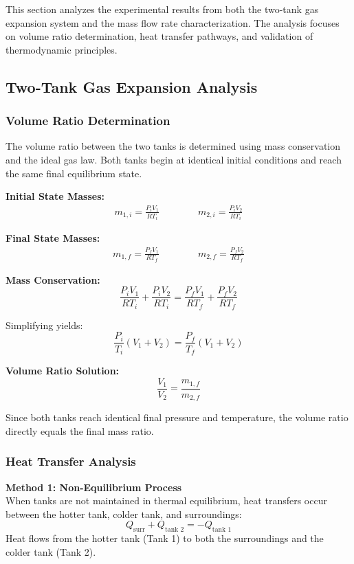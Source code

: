 \documentclass{article} %
\begin{document}
\begin{multicols}{2}
This section analyzes the experimental results from both the two-tank gas expansion system and the mass flow rate characterization. The analysis focuses on volume ratio determination, heat transfer pathways, and validation of thermodynamic principles.

\subsection{Two-Tank Gas Expansion Analysis}

\subsubsection{Volume Ratio Determination}
The volume ratio between the two tanks is determined using mass conservation and the ideal gas law. Both tanks begin at identical initial conditions and reach the same final equilibrium state.

\textbf{Initial State Masses:}
\begin{align*}
m_{1,i} = \frac{P_i V_1}{R T_i} \qquad\qquad
m_{2,i} = \frac{P_i V_2}{R T_i}
\end{align*}

\textbf{Final State Masses:}
\begin{align*}
m_{1,f} = \frac{P_f V_1}{R T_f} \qquad\qquad
m_{2,f} = \frac{P_f V_2}{R T_f}
\end{align*}

\textbf{Mass Conservation:}
\[
\frac{P_i V_1}{R T_i} + \frac{P_i V_2}{R T_i} = \frac{P_f V_1}{R T_f} + \frac{P_f V_2}{R T_f}
\]

Simplifying yields:
\[
\frac{P_i}{T_i}(V_1 + V_2) = \frac{P_f}{T_f}(V_1 + V_2)
\]

\textbf{Volume Ratio Solution:}
\[
\boxed{\frac{V_1}{V_2} = \frac{m_{1,f}}{m_{2,f}}}
\]

Since both tanks reach identical final pressure and temperature, the volume ratio directly equals the final mass ratio.

\subsubsection{Heat Transfer Analysis}
\textbf{Method 1: Non-Equilibrium Process}\\
When tanks are not maintained in thermal equilibrium, heat transfers occur between the hotter tank, colder tank, and surroundings:
\[
Q_{\text{surr}} + Q_{\text{tank 2}} = -Q_{\text{tank 1}}
\]
Heat flows from the hotter tank (Tank 1) to both the surroundings and the colder tank (Tank 2).


\end{multicols}
\end{document}
